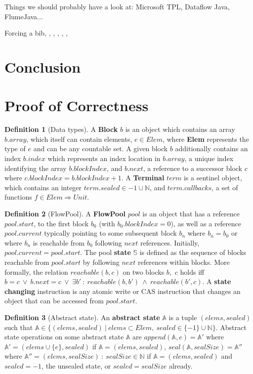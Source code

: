 \documentclass[runningheads,a4paper]{llncs}
\begin{document}
Things we should probably have a look at: Microsoft TPL, Dataflow
Java, FlumeJava...

Forcing a bib, \cite{bowman:reasoning}, \cite{braams:babel}, \cite{clark:pct}, \cite{herlihy:methodology}, \cite{Lamport:LaTeX}, \cite{salas:calculus}
\section{Conclusion}




\appendix
\section{Proof of Correctness}

\textbf{Definition 1} (Data types). A \textbf{Block} $b$ is an object which
contains an array $b.array$, which itself can contain elements, $e \in Elem$,
where \textbf{Elem} represents the type of $e$ and can be any countable set. A
given block $b$ additionally contains an index $b.index$ which represents an
index location in $b.array$, a unique index identifying the array
$b.blockIndex$, and $b.next$, a reference to a successor block $c$ where
$c.blockIndex = b.blockIndex + 1$. A \textbf{Terminal} $term$ is a sentinel
object, which contains an integer $term.sealed \in {-1} \cup \mathbb{N}$, and
$term.callbacks$, a set of functions $f \in Elem \Rightarrow Unit$.

\textbf{Definition 2} (FlowPool). A \textbf{FlowPool} $pool$ is an object that
has a reference $pool.start$, to the first block $b_0$ (with $b_0.blockIndex=0$), 
as well as a reference $pool.current$ typically pointing to some
subsequent block $b_n$ where $b_n=b_0$ or where $b_n$ is reachable from $b_0$
following $next$ references. Initially, $pool.current = pool.start$. The pool
\textbf{state} $\mathbb{S}$ is defined as the sequence of blocks reachable
from $pool.start$ by following $next$ references within blocks. More formally,
the relation $reachable(b,c)$ on two blocks $b,$ $c$ holds iff
$b=c~\vee~b.next=c~\vee~\exists b'~:~reachable(b,b')~\wedge~reachable(b',c)$.
A \textbf{state changing} instruction is any atomic write or CAS instruction
that changes an object that can be accessed from $pool.start$.

\textbf{Definition 3} (Abstract state). An \textbf{abstract state} $\mathbb{A}$ 
is a tuple $(elems,sealed)$ such that $\mathbb{A} \in \{(elems,sealed)~|~elems \subset Elem,~sealed \in \{-1\} \cup \mathbb{N}\}$. 
Abstract state operations on some abstract state $\mathbb{A}$ are $append(\mathbb{A},e) = \mathbb{A'}$ 
where $\mathbb{A'} = (elems \cup \{e\}, sealed)$ if $\mathbb{A}=(elems, sealed)$, 
$seal(\mathbb{A},sealSize) = \mathbb{A''}$ where $\mathbb{A''} = (elems, sealSize)~:~sealSize \in \mathbb{N}$ 
if $\mathbb{A}=(elems, sealed)$ and $sealed=-1$, the unsealed state, or 
$sealed=sealSize$ already.
\end{document}
